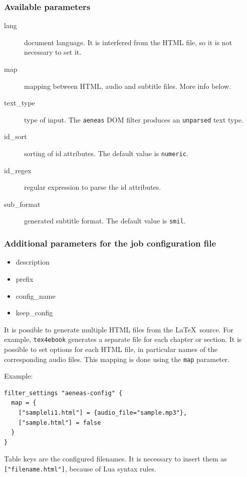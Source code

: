 \subsubsection{Available parameters}\label{available-parameters}

\begin{description}
\item[lang]
document language. It is interfered from the HTML file, so it is not
necessary to set it.
\item[map]
mapping between HTML, audio and subtitle files. More info below.
\item[text\_type]
type of input. The \texttt{aeneas} DOM filter produces an
\texttt{unparsed} text type.
\item[id\_sort]
sorting of id attributes. The default value is \texttt{numeric}.
\item[id\_regex]
regular expression to parse the id attributes.
\item[sub\_format]
generated subtitle format. The default value is \texttt{smil}.
\end{description}

\subsubsection{Additional parameters for the job configuration
file}\label{additional-parameters-for-the-job-configuration-file}

\begin{itemize}
\tightlist
\item
  description
\item
  prefix
\item
  config\_name
\item
  keep\_config
\end{itemize}

It is possible to generate multiple HTML files from the \LaTeX~source.
For example, \texttt{tex4ebook} generates a separate file for each
chapter or section. It is possible to set options for each HTML file, in
particular names of the corresponding audio files. This mapping is done
using the \texttt{map} parameter.

Example:

\begin{verbatim}
filter_settings "aeneas-config" {
  map = {
    ["sampleli1.html"] = {audio_file="sample.mp3"}, 
    ["sample.html"] = false
  }
}
\end{verbatim}

Table keys are the configured filenames. It is necessary to insert them
as \texttt{{[}"filename.html"{]}}, because of Lua syntax rules.

